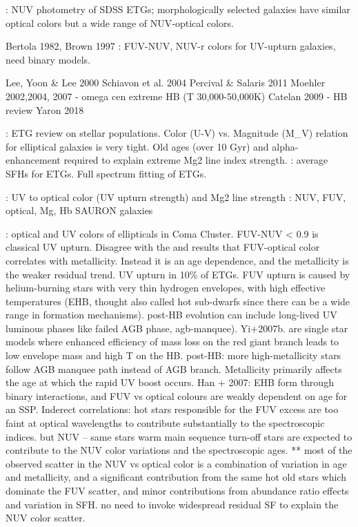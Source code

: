 \citet{Yi+2005,Kaviraj+2007,Schawinski+2007}: NUV photometry of SDSS ETGs; morphologically selected galaxies have similar optical colors but a wide range of NUV-optical colors.


Bertola 1982, Brown 1997
\citet{Hernandez+2014}: FUV-NUV, NUV-r colors for UV-upturn galaxies, need binary models.

Lee, Yoon & Lee 2000
Schiavon et al. 2004
Percival & Salaris 2011
Moehler 2002,2004, 2007 - omega cen extreme HB (T 30,000-50,000K)
Catelan 2009 - HB review
Yaron 2018

\citet{Renzini+2006}: ETG review on stellar populations. Color (U-V) vs. Magnitude (M_V) relation for elliptical galaxies is very tight. Old ages (over 10 Gyr) and alpha-enhancement required to explain extreme Mg2 line index strength.
\citet{Thomas+2005}: average SFHs for ETGs.
\citet{Choi+2014} Full spectrum fitting of ETGs.

\citet{Burstein+1988}: UV to optical color (UV upturn strength) and Mg2 line strength
\citet{Bureau+2011}: NUV, FUV, optical, Mg, Hb SAURON galaxies

\citet{Smith+2012}: optical and UV colors of ellipticals in Coma Cluster. FUV-NUV < 0.9 is classical UV upturn. Disagree with the \citet{Burstein+1988} and \citet{Bureau+2011} results that FUV-optical color correlates with metallicity. Instead it is an age dependence, and the metallicity is the weaker residual trend. UV upturn in 10\% of ETGs. FUV upturn is caused by helium-burning stars with very thin hydrogen envelopes, with high effective temperatures (EHB, thought also called hot sub-dwarfs since there can be a wide range in formation mechanisms). post-HB evolution can include long-lived UV luminous phases like failed AGB phase, agb-manquee). Yi+2007b. are single star models where enhanced efficiency of mass loss on the red giant branch leads to low envelope mass and high T on the HB. post-HB: more high-metallicity stars follow AGB manquee path instead of AGB branch. Metallicity primarily affects the age at which the rapid UV boost occurs. Han + 2007: EHB form through binary interactions, and FUV vs optical colours are weakly dependent on age for an SSP. Inderect correlations: hot stars responsible for the FUV excess are too faint at optical wavelengths to contribute substantially to the spectroscopic indices. but NUV -- same stars warm main sequence turn-off stars are expected to contribute to the NUV color variations and the spectroscopic ages. ** most of the observed scatter in the NUV vs optical color is a combination of variation in age and metallicity, and a significant contribution from the same hot old stars which dominate the FUV scatter,  and minor contributions from abundance ratio effects and variation in SFH. no need to invoke widespread residual SF to explain the NUV color scatter.

